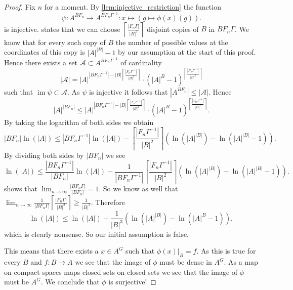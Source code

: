 \documentclass[titlepage, a4paper]{article}
\newcommand{\card}[1]{\left| #1 \right|}
\DeclareMathOperator{\im}{im}
\theoremstyle{remark}
\begin{document}
\begin{proof}
	Fix  $n$ for a moment. By \cref{lem:injective_restriction} the function \[
		\psi: A^{BF_n} \to A^{BF_n\Gamma^{-1}}: x \mapsto (g \mapsto \phi(x)(g))
	.\] 
	is injective.
	 states that we can choose  $ \left\lceil \frac{\card{F_n\Gamma}}{\card{B}^2} \right\rceil $ disjoint copies of $B$ in $BF_n\Gamma$. 
	We know that for every such copy of $B$ the number of possible values at the coordinates of this copy is  $\card{A}^{\card{B}} -1$ by our assumption at the start of this proof.
	Hence there exists a set $\mathcal{A} \subset A^{BF_n\Gamma^{-1}}$ of cardinality \[
		\card{\mathcal{A}} = \card{A}^{\card{BF_n\Gamma^{-1}}- \card{B}\left\lceil \frac{\card{F_n\Gamma^{-1}}}{\card{B}^2} \right\rceil } \cdot (\card{A}^{B} -1)^{\left\lceil \frac{\card{F_n\Gamma^{-1}}}{\card{B}^2} \right\rceil }
\]
such that $\im\psi \subset \mathcal{A}$. 
As $\psi$ is injective it follows that $\card{A^{BF_n}} \le \card{\mathcal{A}}$. Hence
\[
	\card{A}^{\card{BF_n}} \le 
	\card{A}^{\card{BF_n\Gamma^{-1}}- \card{B}\left\lceil \frac{\card{F_n\Gamma^{-1}}}{\card{B}^2} \right\rceil } \cdot (\card{A}^{B} -1)^{\left\lceil \frac{\card{F_n\Gamma^{-1}}}{\card{B}^2} \right\rceil }
.\]
By taking the logarithm of both sides we obtain
\[
	\card{BF_n}\ln(\card{A}) \le \card{BF_n\Gamma^{-1}} \ln(\card{A}) - \left\lceil \frac{\card{F_n\Gamma^{-1}}}{\card{B}^2} \right\rceil \left( \ln(\card{A}^{\card{B}}) - \ln(\card{A}^{\card{B}} -1) \right)   
.\]
By dividing both sides by $\card{BF_n}$ we see 
\[
	\ln(\card{A}) \le \frac{\card{BF_n\Gamma^{-1}}}{\card{BF_n}} \ln(\card{A}) - \frac{1}{\card{BF_n\Gamma^{-1}}}\left\lceil \frac{\card{F_n\Gamma^{-1}}}{\card{B}^2} \right\rceil \left( \ln(\card{A}^{\card{B}}) - \ln(\card{A}^{\card{B}} -1) \right)   
.\]
 shows that $\lim_{n \to \infty} \frac{\card{BF_n\Gamma}}{\card{BF_n}} = 1$. 
So we know as well that $\lim_{n \to \infty} \frac{1}{\card{BF_n\Gamma}} \left\lceil \frac{\card{F_n\Gamma}}{\card{B}^2} \right\rceil \ge \frac{1}{\card{B}^3} $. 
Therefore \[
	\ln(\card{A}) \le \ln(\card{A}) - \frac{1}{\card{B}^3} \left(\ln(\card{A}^{\card{B}}) - \ln(\card{A}^{B} - 1) \right)
,\]
which is clearly nonsense. 
So our initial assumption is false. 

\bigskip

This means that there exists a $x \in A^{G}$ such that $\phi(x)|_B = f$. As this is true for every  $B$ and $f:B\to A$ we see that the image of  $\phi$ must be dense in $A^{G}$. As a map on compact spaces maps closed sets on closed sets we see that the image of $\phi$ must be $A^{G}$. 
We conclude that $\phi$ is surjective!

\end{proof}
\end{document}
